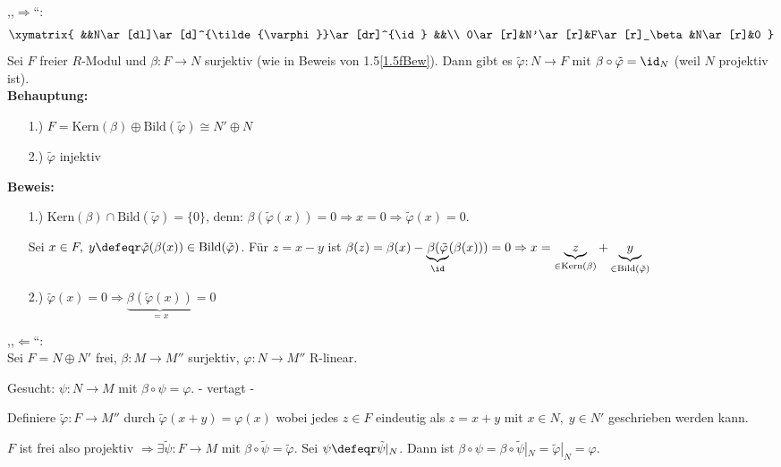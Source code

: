 \begin{Bew}
  ,,$\Rightarrow$``:
  \[\xymatrix{
  &&N\ar[dl]\ar[d]^{\tilde{\varphi}}\ar[dr]^{\id} &&\\
  0\ar[r]&N'\ar[r]&F\ar[r]_\beta&N\ar[r]&0 
  }\]
  Sei $F$ freier $R$-Modul und $\beta: F \to N$ surjektiv (wie in Beweis von
  1.5\ref{1.5fBew}). Dann gibt es $\tilde{\varphi}: N \to F$ mit $\beta \circ
  \tilde{\varphi} = \id_N$ (weil $N$ projektiv ist).\\
  \textbf{Behauptung:}
  \begin{enumerate}
    \item[1.)] $F = \mbox{Kern}(\beta) \oplus \mbox{Bild}(\tilde{\varphi}) \cong
               N' \oplus N$
    \item[2.)] $\tilde{\varphi}$ injektiv
  \end{enumerate}
  \textbf{Beweis:}
  \begin{enumerate}
    \item[1.)] Kern$(\beta) \cap \mbox{Bild}(\tilde{\varphi}) = \{0\}$, denn:
               $\beta(\tilde{\varphi}(x)) = 0 \Rightarrow x = 0 \Rightarrow
               \tilde{\varphi}(x) = 0$.
  
               Sei $x \in F,\; y \defeqr
               \tilde{\varphi}(\beta(x)) \in \mbox{Bild}(\tilde{\varphi})$.
               Für $z = x - y$ ist $\beta(z) = \beta(x) -
               \underbrace{\beta(\tilde{\varphi}}_{\id}(\beta(x)))= 0 \Rightarrow x = \underbrace{z}_{\in
               \textrm{Kern}(\beta)} + \underbrace{y}_{\in \textrm{Bild}(\tilde{\varphi})}$
    \item[2.)] $\tilde{\varphi}(x) = 0 \Rightarrow \underbrace{\beta(\tilde{\varphi}(x))}_{= x} = 0$
  \end{enumerate}
  ,,$\Leftarrow$``:\\
  Sei $F = N \oplus N'$ frei, $\beta: M \to M''$ surjektiv, $\varphi: N \to M''$
  R-linear.

  Gesucht: $\psi: N \to M$ mit $\beta \circ \psi = \varphi$. - vertagt -

  Definiere $\tilde{\varphi}: F \to M''$ durch $\tilde{\varphi}(x + y) =
  \varphi(x)$ wobei jedes $z \in F$ eindeutig als $z = x + y$ mit $x \in N,\; y
  \in N'$ geschrieben werden kann.

  $F$ ist frei also projektiv $\Rightarrow \exists \tilde{\psi}: F \to M$ mit
  $\beta \circ \tilde{\psi} = \tilde{\varphi}$. Sei $\psi \defeqr
  \tilde{\psi}|_N$. Dann ist $\beta \circ \psi = \beta \circ \tilde{\psi}|_N =
  \tilde{\varphi}|_N = \varphi$.
\end{Bew}
